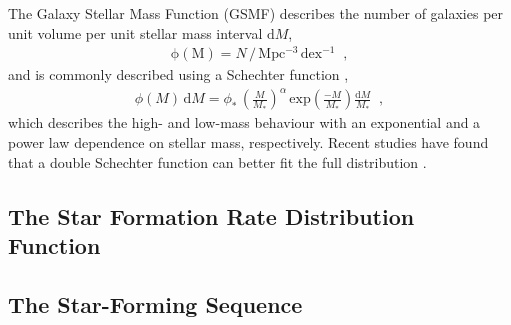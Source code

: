 
The Galaxy Stellar Mass Function (GSMF) describes the number of galaxies per unit volume per unit stellar mass interval $\mathrm{d}M$,
\begin{align}
    \mathrm{\phi(M)} = N \,/\, \mathrm{Mpc^{-3} \, dex^{-1}}\;\;,
\end{align}
and is commonly described using a Schechter function \citep{schechter_analytic_1976},
\begin{align}
    \phi(M) \, \mathrm{d}M = \phi_{*} \, \left( \frac{M}{M_{*}}\right)^{\alpha} \, \mathrm{exp}\left( \frac{-M}{M_{*}} \right) \frac{\mathrm{d}M}{M_{*}}\;\;,
\end{align}
which describes the high- and low-mass behaviour with an exponential and a power law dependence on stellar mass, respectively.
Recent studies have found that a double Schechter function can better fit the full distribution \citep[\textit{e.g.} the GAMA survey, ][]{baldry_galaxy_2008}.


\subsection{The Star Formation Rate Distribution Function}



\subsection{The Star-Forming Sequence}

